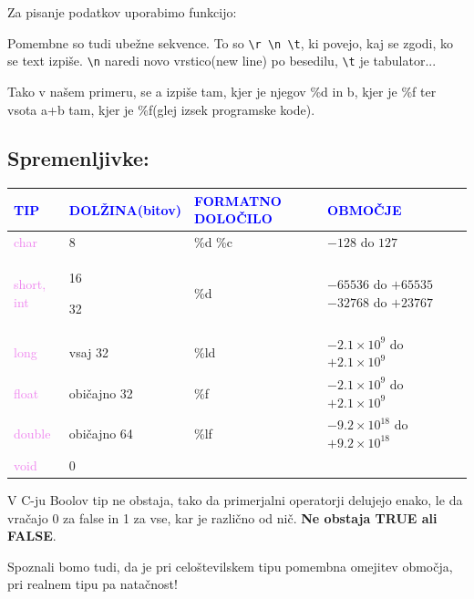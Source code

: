 \documentclass[a4paper, 12pt]{article}
\begin{document}
Za pisanje podatkov uporabimo funkcijo:

{\centering{}\par}

Pomembne so tudi ubežne sekvence. To so \texttt{\textbackslash r \textbackslash n \textbackslash t}, ki povejo, kaj se zgodi, ko se text izpiše. \texttt{\textbackslash n} naredi novo vrstico(new line) po besedilu, \texttt{\textbackslash t} je tabulator...\

Tako v našem primeru, se a izpiše tam, kjer je njegov \%d in b, kjer je \%f ter vsota a+b tam, kjer je \%f(glej izsek programske kode).

\subsection{Spremenljivke:}

\begin{center}
	\begin{tabular}[b]{|p{3cm}|p{3cm}|p{3cm}|p{4.5cm}|}
		\hline \textcolor{blue}{TIP} & \textcolor{blue}{DOLŽINA(bitov)} & \textcolor{blue}{FORMATNO DOLOČILO} & \textcolor{blue}{OBMOČJE} \\ \hline\hline
		\textcolor{violet}{char} & 8 & \%d \%c& $-128$ do $127$ \\
		\textcolor{violet}{short, int} & 16\ 
		
		32  & \%d &$-65536$ do $+65535$ \ $-32768$ do $+23767$\\
		\textcolor{violet}{long} & vsaj 32 & \%ld & $-2.1\times10^9$ do $+2.1\times10^9$\\
		\textcolor{violet}{float} & običajno 32 & \%f & $-2.1\times10^9$ do $+2.1\times10^9$\\
		\textcolor{violet}{double} & običajno 64 &\%lf& $-9.2\times10^{18}$ do $+9.2\times10^{18}$ \\
		\textcolor{violet}{void} & 0 & & \\ \hline
	\end{tabular}
\end{center}


V C-ju Boolov tip ne obstaja, tako da primerjalni operatorji delujejo enako, le da vračajo 0 za false in 1 za vse, kar je različno od nič. \textbf{Ne obstaja TRUE ali FALSE}.\

Spoznali bomo tudi, da je pri celoštevilskem tipu pomembna omejitev območja, pri realnem tipu pa natačnost!
\end{document}
